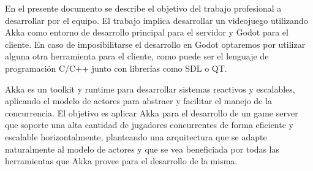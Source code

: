 \noindent En el presente documento se describe el objetivo del trabajo profesional a desarrollar 
por el equipo. El trabajo implica desarrollar un videojuego utilizando Akka como entorno 
de desarrollo principal para el servidor y Godot para el cliente. 
En caso de imposibilitarse el desarrollo en Godot optaremos por utilizar alguna otra 
herramienta para el cliente, como puede ser el lenguaje de programación C/C++ junto con
librerías como SDL o QT.

Akka es un toolkit y runtime para desarrollar sistemas reactivos y escalables, 
aplicando el modelo de actores para abstraer y facilitar el manejo de la concurrencia. 
El objetivo es aplicar Akka para el desarrollo de un game server que soporte una alta cantidad 
de jugadores concurrentes de forma eficiente y escalable horizontalmente, 
planteando una arquitectura que se adapte naturalmente al modelo de actores y 
que se vea beneficiada por todas las herramientas que Akka provee para el desarrollo de la misma.

